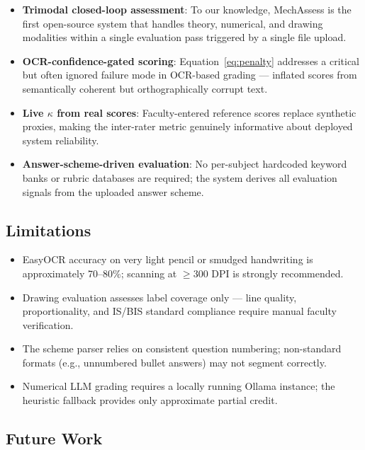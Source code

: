 \documentclass[conference]{IEEEtran}
\begin{document}
\begin{itemize}
    \item \textbf{Trimodal closed-loop assessment}: To our knowledge, MechAssess is the first open-source system that handles theory, numerical, and drawing modalities within a single evaluation pass triggered by a single file upload.
    \item \textbf{OCR-confidence-gated scoring}: Equation~\eqref{eq:penalty} addresses a critical but often ignored failure mode in OCR-based grading — inflated scores from semantically coherent but orthographically corrupt text.
    \item \textbf{Live $\kappa$ from real scores}: Faculty-entered reference scores replace synthetic proxies, making the inter-rater metric genuinely informative about deployed system reliability.
    \item \textbf{Answer-scheme-driven evaluation}: No per-subject hardcoded keyword banks or rubric databases are required; the system derives all evaluation signals from the uploaded answer scheme.
\end{itemize}

\subsection{Limitations}

\begin{itemize}
    \item EasyOCR accuracy on very light pencil or smudged handwriting is approximately 70--80\%; scanning at $\geq 300$ DPI is strongly recommended.
    \item Drawing evaluation assesses label coverage only — line quality, proportionality, and IS/BIS standard compliance require manual faculty verification.
    \item The scheme parser relies on consistent question numbering; non-standard formats (e.g., unnumbered bullet answers) may not segment correctly.
    \item Numerical LLM grading requires a locally running Ollama instance; the heuristic fallback provides only approximate partial credit.
\end{itemize}

\subsection{Future Work}
\end{document}
